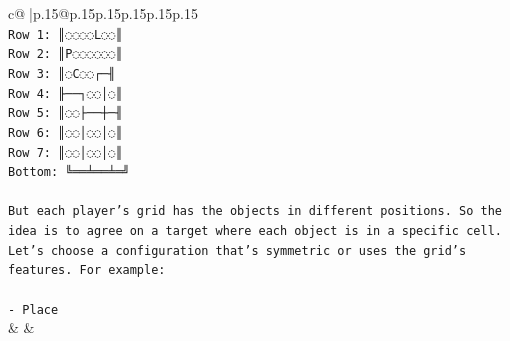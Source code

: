 \documentclass{article}
\begin{document}
{\begin{supertabular}{c@{$\;$}|p{.15\linewidth}@{}p{.15\linewidth}p{.15\linewidth}p{.15\linewidth}p{.15\linewidth}p{.15\linewidth}}
{{{\\ 
\texttt{Row 1: ║◌◌◌◌L◌◌║} \\
\texttt{Row 2: ║P◌◌◌◌◌◌║} \\
\texttt{Row 3: ║◌C◌◌┌─╢} \\
\texttt{Row 4: ╟──┐◌◌│◌║} \\
\texttt{Row 5: ║◌◌├──┼─╢} \\
\texttt{Row 6: ║◌◌│◌◌│◌║} \\
\texttt{Row 7: ║◌◌│◌◌│◌║} \\
\texttt{Bottom: ╚══╧══╧═╝} \\
\\ 
\texttt{But each player's grid has the objects in different positions. So the idea is to agree on a target where each object is in a specific cell. Let's choose a configuration that's symmetric or uses the grid's features. For example:} \\
\\ 
\texttt{{-} Place} \\
            }
        }
    }
    & & \\ \\


\end{supertabular}}
\end{document}
